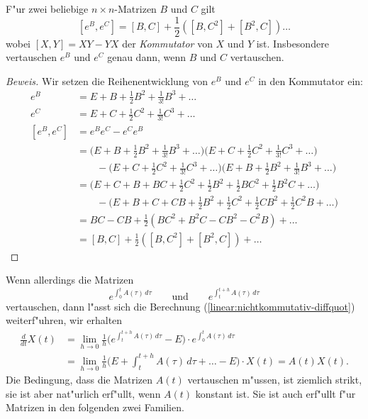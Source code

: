 \begin{satz}
%
F"ur zwei beliebige $n\times n$-Matrizen $B$ und $C$ gilt
\[
[e^B,e^C]=[B,C]+\frac12([B,C^2]+[B^2,C])\dots
\]
wobei $[X,Y]=XY-YX$ der {\em Kommutator} von $X$ und $Y$ ist.
%
Insbesondere vertauschen $e^B$ und $e^C$ genau dann, wenn $B$ und $C$
vertauschen.
\end{satz}

\begin{proof}[Beweis]
Wir setzen die Reihenentwicklung von $e^B$ und $e^C$ in den Kommutator
ein:
\begin{align*}
e^B
&=
E+B+\frac12B^2+\frac1{3!}B^3+\dots
\\
e^C
&=
E+C+\frac12C^2+\frac1{3!}C^3+\dots
\\
[e^B,e^C]
&=
e^Be^C-e^Ce^B
\\
&=
\biggl(E+B+\frac12B^2+\frac1{3!}B^3+\dots\biggr)
\biggl(E+C+\frac12C^2+\frac1{3!}C^3+\dots\biggr)
\\
&\qquad
-
\biggl(E+C+\frac12C^2+\frac1{3!}C^3+\dots\biggr)
\biggl(E+B+\frac12B^2+\frac1{3!}B^3+\dots\biggr)
\\
&=
\biggl(E+C+B+BC+\frac12C^2+\frac12B^2+\frac12BC^2+\frac12B^2C+\dots\biggr)
\\
&\qquad
-
\biggl(E+B+C+CB+\frac12B^2+\frac12C^2+\frac12CB^2+\frac12C^2B+\dots\biggr)
\\
&=
BC-CB+\frac12(BC^2+B^2C-CB^2-C^2B)+\dots
\\
&=[B,C]+\frac12([B,C^2]+[B^2,C])+\dots
\end{align*}
\end{proof}
Wenn allerdings die Matrizen
\[
e^{\int_0^tA(\tau)\,d\tau}
\qquad\text{und}\qquad
e^{\int_t^{t+h}A(\tau)\,d\tau}
\]
vertauschen, dann l"asst sich die Berechnung
(\ref{linear:nichtkommutativ-diffquot}) weiterf"uhren, wir
erhalten
\begin{align*}
\frac{d}{dt}X(t)
&=
\lim_{h\to 0}\frac1h\biggl(
e^{\int_t^{t+h}A(\tau)\,d\tau}
-
E
\biggr)
\cdot
e^{\int_0^tA(\tau)\,d\tau}
\\
&=
\lim_{h\to0}\frac1h
\biggl(E+\int_t^{t+h}A(\tau)\,d\tau+\dots-E\biggr)\cdot X(t)
=A(t)X(t).
\end{align*}
Die Bedingung, dass die Matrizen $A(t)$ vertauschen m"ussen, ist
ziemlich strikt, sie ist aber nat"urlich erf"ullt, wenn $A(t)$
konstant ist.
Sie ist auch erf"ullt f"ur Matrizen in den folgenden zwei
Familien.
